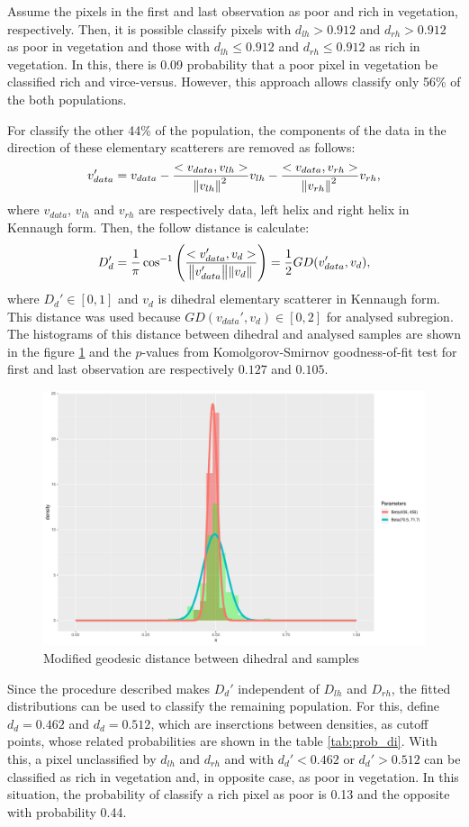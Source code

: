 \documentclass[12pt]{article}
\begin{document}
Assume the pixels in the first and last observation as poor and rich in vegetation, respectively. Then, it is possible classify pixels with $d_{lh} > 0.912$ and $d_{rh} > 0.912$ as poor in vegetation and those with $d_{lh} \le 0.912$ and $d_{rh} \le 0.912$ as rich in vegetation. In this, there is 0.09 probability that a poor pixel in vegetation be classified rich and virce-versus. However, this approach allows classify only 56\% of the both populations.

For classify the other 44\% of the population, the components of the data in the direction of these elementary scatterers are removed as follows:
\begin{equation}
  v_{data}' =  v_{data} - \frac{<v_{data}, v_{lh}>}{\norm{v_{lh}}^2} v_{lh} - \frac{<v_{data}, v_{rh}>}{\norm{v_{rh}}^2} v_{rh},
\end{equation}
where $v_{data}$, $v_{lh}$ and $v_{rh}$ are respectively data, left helix and right helix in Kennaugh form. Then, the follow distance is calculate:
\begin{equation}
  D_{d}' = \frac{1}{\pi} \cos^{-1}\left(\frac{<v_{data}', v_d>}{\norm{v_{data}'}\norm{v_d}}\right) = \frac{1}{2}GD(v_{data}', v_d),
\end{equation}
where $D_d' \in [0, 1]$ and $v_d$ is dihedral elementary scatterer in Kennaugh form. This distance was used because $GD(v_{data}', v_d) \in [0, 2]$ for analysed subregion. The histograms of this distance between dihedral and analysed samples are shown in the figure \ref{fig:hist_di} and the $p$-values from Komolgorov-Smirnov goodness-of-fit test for first and last observation are respectively $0.127$ and $0.105$. 
\begin{figure}[!h]
  \centering
  \includegraphics[width = .5\linewidth]{Histograms/hist_mod_di}
  \caption{Modified geodesic distance between dihedral and samples}
  \label{fig:hist_di}
\end{figure}

Since the procedure described makes $D_d'$ independent of $D_{lh}$ and $D_{rh}$, the fitted distributions can be used to classify the remaining population. For this, 
define $d_d = 0.462$ and $d_d = 0.512$, which are inserctions between densities, as cutoff points, whose related probabilities are shown in the table \ref{tab:prob_di}.
With this, a pixel unclassified by $d_{lh}$ and $d_{rh}$ and with $d_d' < 0.462$ or $d_d' > 0.512$ can be classified as rich in vegetation and, in opposite case, as poor in vegetation. In this situation, the probability of classify a rich pixel as poor is 0.13 and the opposite with probability 0.44.
\end{document}
